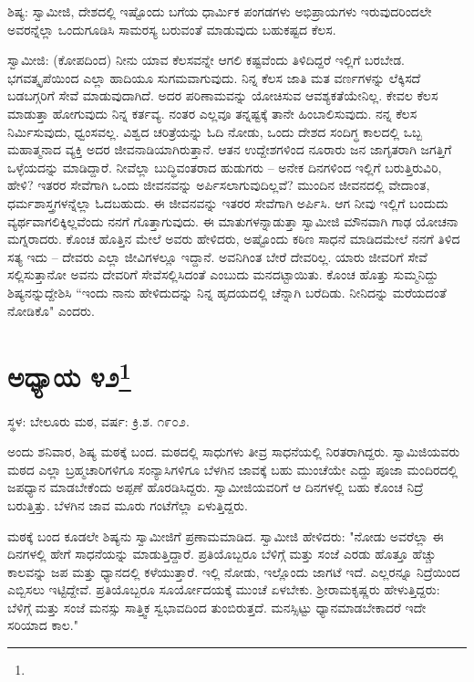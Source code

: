 ಶಿಷ್ಯ: ಸ್ವಾಮೀಜಿ, ದೇಶದಲ್ಲಿ ಇಷ್ಟೊಂದು ಬಗೆಯ ಧಾರ್ಮಿಕ ಪಂಗಡಗಳು ಅಭಿಪ್ರಾಯಗಳು ಇರುವುದರಿಂದಲೇ ಅವರನ್ನೆಲ್ಲಾ ಒಂದುಗೂಡಿಸಿ ಸಾಮರಸ್ಯ ಬರುವಂತೆ ಮಾಡುವುದು ಬಹುಕಷ್ಟದ ಕೆಲಸ.

ಸ್ವಾಮೀಜಿ: (ಕೋಪದಿಂದ) ನೀನು ಯಾವ ಕೆಲಸವನ್ನೇ ಆಗಲಿ ಕಷ್ಟವೆಂದು ತಿಳಿದಿದ್ದರೆ ಇಲ್ಲಿಗೆ ಬರಬೇಡ. ಭಗವತ್ಕೃಪೆಯಿಂದ ಎಲ್ಲಾ ಹಾದಿಯೂ ಸುಗಮವಾಗುವುದು. ನಿನ್ನ ಕೆಲಸ ಜಾತಿ ಮತ ವರ್ಣಗಳನ್ನು ಲೆಕ್ಕಿಸದೆ ಬಡಬಗ್ಗರಿಗೆ ಸೇವೆ ಮಾಡುವುದಾಗಿದೆ. ಅದರ ಪರಿಣಾಮವನ್ನು ಯೋಚಿಸುವ ಆವಶ್ಯಕತೆಯೇನಿಲ್ಲ. ಕೇವಲ ಕೆಲಸ ಮಾಡುತ್ತಾ ಹೋಗುವುದು ನಿನ್ನ ಕರ್ತವ್ಯ. ನಂತರ ಎಲ್ಲವೂ ತನ್ನಷ್ಟಕ್ಕೆ ತಾನೇ ಹಿಂಬಾಲಿಸುವುದು. ನನ್ನ ಕೆಲಸ ನಿರ್ಮಿಸುವುದು, ಧ್ವಂಸವಲ್ಲ. ವಿಶ್ವದ ಚರಿತ್ರೆಯನ್ನು ಓದಿ ನೋಡು, ಒಂದು ದೇಶದ ಸಂದಿಗ್ಧ ಕಾಲದಲ್ಲಿ ಒಬ್ಬ ಮಹಾತ್ಮನಾದ ವ್ಯಕ್ತಿ ಅದರ ಜೀವನಾಡಿಯಾಗಿರುತ್ತಾನೆ. ಆತನ ಉದ್ದೇಶಗಳಿಂದ ನೂರಾರು ಜನ ಜಾಗೃತರಾಗಿ ಜಗತ್ತಿಗೆ ಒಳ್ಳೆಯದನ್ನು ಮಾಡಿದ್ದಾರೆ. ನೀವೆಲ್ಲಾ ಬುದ್ಧಿವಂತರಾದ ಹುಡುಗರು – ಅನೇಕ ದಿನಗಳಿಂದ ಇಲ್ಲಿಗೆ ಬರುತ್ತಿರುವಿರಿ, ಹೇಳಿ? ಇತರರ ಸೇವೆಗಾಗಿ ಒಂದು ಜೀವನವನ್ನು ಅರ್ಪಿಸಲಾಗುವುದಿಲ್ಲವೆ? ಮುಂದಿನ ಜೀವನದಲ್ಲಿ ವೇದಾಂತ, ಧರ್ಮಶಾಸ್ತ್ರಗಳನ್ನೆಲ್ಲಾ ಓದಬಹುದು. ಈ ಜೀವನವನ್ನು ಇತರರ ಸೇವೆಗಾಗಿ ಅರ್ಪಿಸಿ. ಆಗ ನೀವು ಇಲ್ಲಿಗೆ ಬಂದುದು ವ್ಯರ್ಥವಾಗಲಿಕ್ಕಿಲ್ಲವೆಂದು ನನಗೆ ಗೊತ್ತಾಗುವುದು. ಈ ಮಾತುಗಳನ್ನಾಡುತ್ತಾ ಸ್ವಾಮೀಜಿ ಮೌನವಾಗಿ ಗಾಢ ಯೋಚನಾ ಮಗ್ನರಾದರು. ಕೊಂಚ ಹೊತ್ತಿನ ಮೇಲೆ ಅವರು ಹೇಳಿದರು, ಅಷ್ಟೊಂದು ಕಠಿಣ ಸಾಧನೆ ಮಾಡಿದಮೇಲೆ ನನಗೆ ತಿಳಿದ ಸತ್ಯ ಇದು – ದೇವರು ಎಲ್ಲಾ ಜೀವಿಗಳಲ್ಲೂ ಇದ್ದಾನೆ. ಅವನಿಗಿಂತ ಬೇರೆ ದೇವರಿಲ್ಲ. ಯಾರು ಜೀವರಿಗೆ ಸೇವೆ ಸಲ್ಲಿಸುತ್ತಾನೋ ಅವನು ದೇವರಿಗೆ ಸೇವೆಸಲ್ಲಿಸಿದಂತೆ ಎಂಬುದು ಮನದಟ್ಟಾಯಿತು. ಕೊಂಚ ಹೊತ್ತು ಸುಮ್ಮನಿದ್ದು ಶಿಷ್ಯನನ್ನುದ್ದೇಶಿಸಿ “ಇಂದು ನಾನು ಹೇಳಿದುದನ್ನು ನಿನ್ನ ಹೃದಯದಲ್ಲಿ ಚೆನ್ನಾಗಿ ಬರೆದಿಡು. ನೀನಿದನ್ನು ಮರೆಯದಂತೆ ನೋಡಿಕೊ" ಎಂದರು.

\newpage

\chapter[ಅಧ್ಯಾಯ ೪೨]{ಅಧ್ಯಾಯ ೪೨\protect\footnote{}}

\centerline{ಸ್ಥಳ: ಬೇಲೂರು ಮಠ, ವರ್ಷ: ಕ್ರಿ.ಶ. ೧೯೦೨.}

ಅಂದು ಶನಿವಾರ, ಶಿಷ್ಯ ಮಠಕ್ಕೆ ಬಂದ. ಮಠದಲ್ಲಿ ಸಾಧುಗಳು ತೀವ್ರ ಸಾಧನೆಯಲ್ಲಿ ನಿರತರಾಗಿದ್ದರು. ಸ್ವಾಮಿಜಿಯವರು ಮಠದ ಎಲ್ಲಾ ಬ್ರಹ್ಮಚಾರಿಗಳಿಗೂ ಸಂನ್ಯಾಸಿಗಳಿಗೂ ಬೆಳಗಿನ ಜಾವಕ್ಕೆ ಬಹು ಮುಂಚೆಯೇ ಎದ್ದು ಪೂಜಾ ಮಂದಿರದಲ್ಲಿ ಜಪಧ್ಯಾನ ಮಾಡಬೇಕೆಂದು ಅಪ್ಪಣೆ ಹೊರಡಿಸಿದ್ದರು. ಸ್ವಾಮೀಜಿಯವರಿಗೆ ಆ ದಿನಗಳಲ್ಲಿ ಬಹು ಕೊಂಚ ನಿದ್ರೆ ಬರುತ್ತಿತ್ತು. ಬೆಳಗಿನ ಜಾವ ಮೂರು ಗಂಟೆಗೆಲ್ಲಾ ಏಳುತ್ತಿದ್ದರು.

ಮಠಕ್ಕೆ ಬಂದ ಕೂಡಲೇ ಶಿಷ್ಯನು ಸ್ವಾಮೀಜಿಗೆ ಪ್ರಣಾಮಮಾಡಿದ. ಸ್ವಾಮೀಜಿ ಹೇಳಿದರು: "ನೋಡು ಅವರೆಲ್ಲಾ ಈ ದಿನಗಳಲ್ಲಿ ಹೇಗೆ ಸಾಧನೆಯನ್ನು ಮಾಡುತ್ತಿದ್ದಾರೆ. ಪ್ರತಿಯೊಬ್ಬರೂ ಬೆಳಿಗ್ಗೆ ಮತ್ತು ಸಂಜೆ ಎರಡು ಹೊತ್ತೂ ಹೆಚ್ಚು ಕಾಲವನ್ನು ಜಪ ಮತ್ತು ಧ್ಯಾನದಲ್ಲಿ ಕಳೆಯುತ್ತಾರೆ. ಇಲ್ಲಿ ನೋಡು, ಇಲ್ಲೊಂದು ಜಾಗಟೆ ಇದೆ. ಎಲ್ಲರನ್ನೂ ನಿದ್ರೆಯಿಂದ ಎಬ್ಬಿಸಲು ಇಟ್ಟಿದ್ದೇವೆ. ಪ್ರತಿಯೊಬ್ಬರೂ ಸೂರ್ಯೋದಯಕ್ಕೆ ಮುಂಚೆ ಏಳಬೇಕು. ಶ‍್ರೀರಾಮಕೃಷ್ಣರು ಹೇಳುತ್ತಿದ್ದರು: ಬೆಳಿಗ್ಗೆ ಮತ್ತು ಸಂಜೆ ಮನಸ್ಸು ಸಾತ್ತ್ವಿಕ ಸ್ವಭಾವದಿಂದ ತುಂಬಿರುತ್ತದೆ. ಮನಸ್ಸಿಟ್ಟು ಧ್ಯಾನಮಾಡಬೇಕಾದರೆ ಇದೇ ಸರಿಯಾದ ಕಾಲ."

